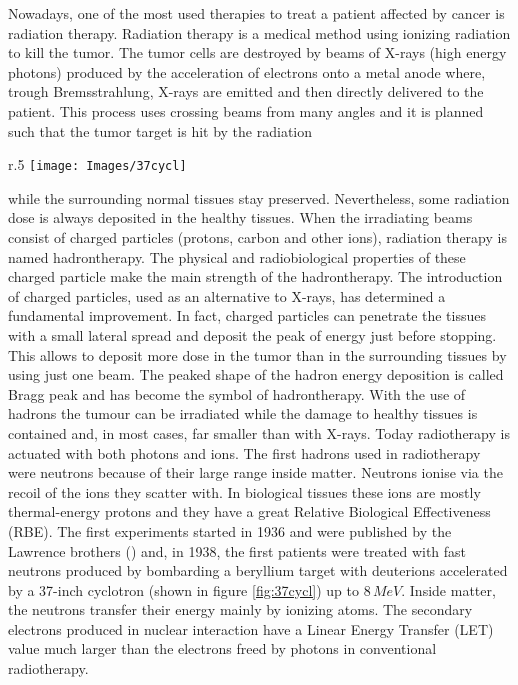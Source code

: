 \documentclass[12pt, a4paper, twoside]{book}
\begin{document}
Nowadays, one of the most used therapies to treat a patient affected by cancer is radiation therapy. Radiation therapy is a medical method using ionizing radiation to kill the tumor. The tumor cells are destroyed by beams of X-rays (high energy photons) produced by the acceleration of electrons onto a metal anode where, trough Bremsstrahlung, X-rays are emitted and then directly delivered to the patient. 
This process uses crossing beams from many angles and it is planned such that the tumor target is hit by the radiation
\begin{wrapfigure}{r}{.5\textwidth}
\centering
{\texttt{[image: Images/37cycl]}}
\caption{E. O. Lawrence (right) and M.S. Livingston (left) standing beside the 37-inch
cyclotron (Berkeley Lab). From \emph{The evolution of the cyclotron} by Lawrence E.O. -
Nobel Lecture, 1951}
\label{fig:37cycl}
\vspace{-5mm}
\end{wrapfigure}
\noindent while the surrounding normal tissues stay preserved. Nevertheless, some radiation dose is always deposited in the healthy tissues.
When the irradiating beams consist of charged particles (protons, carbon and other ions), radiation therapy is named hadrontherapy. The physical and radiobiological properties of these charged particle make the main strength of the hadrontherapy.
The introduction of charged particles, used as an alternative to X-rays, has determined a fundamental improvement. In fact, charged particles can penetrate the tissues with a small lateral spread and deposit the peak of energy just before stopping. This allows to deposit more dose in the tumor than in the surrounding tissues by using just one beam.
The peaked shape of the hadron energy deposition is called Bragg peak and has become the symbol of hadrontherapy. With the use of hadrons the tumour can be irradiated while the damage to healthy tissues is contained and, in most cases, far smaller than with X-rays. Today radiotherapy is actuated with both photons and ions.
The first hadrons used in radiotherapy were neutrons because of their large range inside matter. Neutrons ionise via the recoil of the ions they scatter with. In biological tissues these ions are mostly thermal-energy protons and they have a great Relative Biological Effectiveness (RBE). 
The first experiments started in 1936 and were published by the Lawrence brothers (\cite{law:neut}) and, in 1938, the first patients were treated with fast neutrons produced by bombarding a beryllium target with deuterions accelerated by a 37-inch cyclotron (shown in figure \ref{fig:37cycl}) up to $8\,MeV$. Inside matter, the neutrons transfer their energy mainly by ionizing atoms. The secondary electrons produced in nuclear interaction have a Linear Energy Transfer (LET) value much larger than the electrons freed by photons in conventional radiotherapy.
\end{document}
